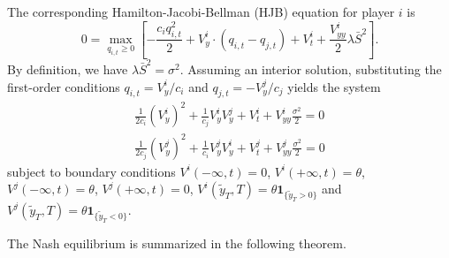 \documentclass[mnsc]{informs3}
\begin{document}
The corresponding Hamilton-Jacobi-Bellman (HJB) equation for player $i$ is
\begin{equation*}
0 = \max_{q_{i,t}\ge0}\left[-\frac{c_iq_{i,t}^2}{2} + V^i_{y}\cdot\left(q_{i,t}-q_{j,t}\right)+V^i_t + \frac{V^i_{yy}}{2}\lambda \bar{S}^2\right].
\end{equation*}
By definition, we have $\lambda \bar{S}^2 = \sigma^2$.
Assuming an interior solution, substituting the first-order conditions $q_{i,t} = V^i_y/c_i$ and $q_{j,t} = -V^j_y/c_j$ yields the system
\begin{equation*}
\begin{aligned}
\frac{1}{2c_i}(V^i_y)^2 + \frac{1}{c_j}V^i_yV^j_y + V^i_t + V^i_{yy}\frac{\sigma^2}{2} = 0\\
\frac{1}{2c_j}(V^j_y)^2 + \frac{1}{c_i}V^j_yV^i_y + V^j_t + V^j_{yy}\frac{\sigma^2}{2} = 0
\end{aligned}
\end{equation*}
subject to boundary conditions $V^i(-\infty, t) = 0$, $V^i(+\infty, t) = \theta$, $V^j(-\infty, t) = \theta$, $V^j(+\infty, t)=0$, $V^i(\tilde{y}_T, T) = \theta \mathbf 1_{\{\tilde y_T>0\}}$ and $V^j(\tilde{y}_T, T) = \theta \mathbf 1_{\{\tilde y_T<0\}}$.


The Nash equilibrium is summarized in the following theorem.
\end{document}
